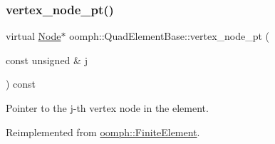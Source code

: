 \mbox{\label{classoomph_1_1QuadElementBase_a4873d97a8792ddbf951062c1d0069da7}} 
\subsubsection{\texorpdfstring{vertex\+\_\+node\+\_\+pt()}{vertex\_node\_pt()}}
{\footnotesize\ttfamily virtual \hyperlink{classoomph_1_1Node}{Node}$\ast$ oomph\+::\+Quad\+Element\+Base\+::vertex\+\_\+node\+\_\+pt (\begin{DoxyParamCaption}\item[{const unsigned \&}]{j }\end{DoxyParamCaption}) const\hspace{0.3cm}{\ttfamily [pure virtual]}}



Pointer to the j-\/th vertex node in the element. 



Reimplemented from \hyperlink{classoomph_1_1FiniteElement_a863c4382c879a77ad5607c6f9781c761}{oomph\+::\+Finite\+Element}.



